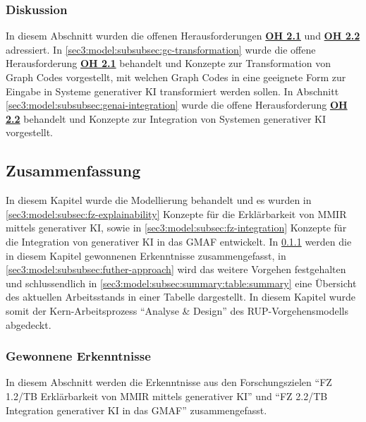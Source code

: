\FloatBarrier

\subsubsection{Diskussion}
\label{sec3:model:subsubsec:fz2:discussion}
In diesem Abschnitt wurden die offenen Herausforderungen \hyperref[sec2:sota:oi:2.1]{\textbf{OH 2.1}} und \hyperref[sec2:sota:oi:2.2]{\textbf{OH 2.2}} adressiert.
In \cref{sec3:model:subsubsec:gc-transformation} wurde die offene Herausforderung \hyperref[sec2:sota:oi:2.1]{\textbf{OH 2.1}} behandelt und Konzepte zur Transformation von Graph Codes vorgestellt, mit welchen Graph Codes in eine geeignete Form zur Eingabe in Systeme generativer KI transformiert werden sollen.
In Abschnitt \cref{sec3:model:subsubsec:genai-integration} wurde die offene Herausforderung \hyperref[sec2:sota:oi:2.2]{\textbf{OH 2.2}} behandelt und Konzepte zur Integration von Systemen generativer KI vorgestellt.

\clearpage

\subsection{Zusammenfassung}
\label{sec3:model:subsec:summary}
In diesem Kapitel wurde die Modellierung behandelt und es wurden in \cref{sec3:model:subsec:fz-explainability} Konzepte für die Erklärbarkeit von MMIR mittels generativer KI, sowie in \cref{sec3:model:subsec:fz-integration} Konzepte für die Integration von generativer KI in das GMAF entwickelt.
In \cref{sec3:model:subsubsec:summary-findings} werden die in diesem Kapitel gewonnenen Erkenntnisse zusammengefasst, in \cref{sec3:model:subsubsec:futher-approach} wird das weitere Vorgehen festgehalten und schlussendlich in \cref{sec3:model:subsec:summary:table:summary} eine Übersicht des aktuellen Arbeitsstands in einer Tabelle dargestellt.
In diesem Kapitel wurde somit der Kern-Arbeitsprozess \enquote{Analyse \& Design} des RUP-Vorgehensmodells abgedeckt.

\subsubsection{Gewonnene Erkenntnisse}
\label{sec3:model:subsubsec:summary-findings}
In diesem Abschnitt werden die Erkenntnisse aus den Forschungszielen \enquote{FZ 1.2/TB Erklärbarkeit von MMIR mittels generativer KI} und \enquote{FZ 2.2/TB Integration generativer KI in das GMAF} zusammengefasst.

